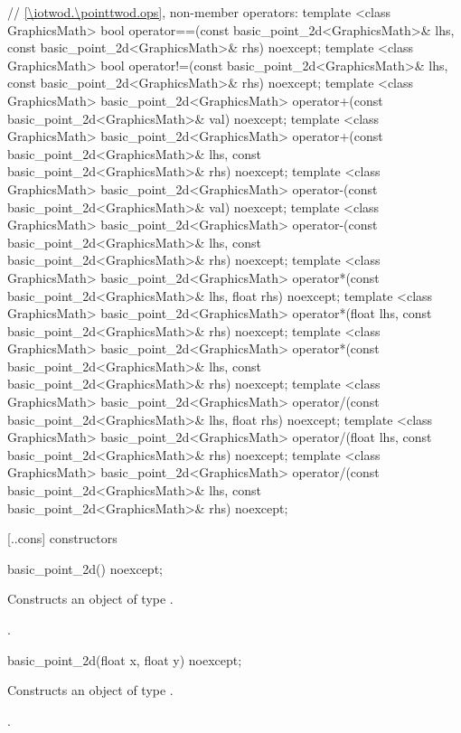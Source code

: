 \begin{codeblock}
{  // \ref{\iotwod.\pointtwod.ops}, non-member operators:
  template <class GraphicsMath>
  bool operator==(const basic_point_2d<GraphicsMath>& lhs,
    const basic_point_2d<GraphicsMath>& rhs) noexcept;
  template <class GraphicsMath>
  bool operator!=(const basic_point_2d<GraphicsMath>& lhs,
    const basic_point_2d<GraphicsMath>& rhs) noexcept;
  template <class GraphicsMath>
  basic_point_2d<GraphicsMath> operator+(const basic_point_2d<GraphicsMath>& val) noexcept;
  template <class GraphicsMath>
  basic_point_2d<GraphicsMath> operator+(const basic_point_2d<GraphicsMath>& lhs,
    const basic_point_2d<GraphicsMath>& rhs) noexcept;
  template <class GraphicsMath>
  basic_point_2d<GraphicsMath> operator-(const basic_point_2d<GraphicsMath>& val) noexcept;
  template <class GraphicsMath>
  basic_point_2d<GraphicsMath> operator-(const basic_point_2d<GraphicsMath>& lhs,
    const basic_point_2d<GraphicsMath>& rhs) noexcept;
  template <class GraphicsMath>
  basic_point_2d<GraphicsMath> operator*(const basic_point_2d<GraphicsMath>& lhs,
    float rhs) noexcept;
  template <class GraphicsMath>
  basic_point_2d<GraphicsMath> operator*(float lhs,
    const basic_point_2d<GraphicsMath>& rhs) noexcept;
  template <class GraphicsMath>
  basic_point_2d<GraphicsMath> operator*(const basic_point_2d<GraphicsMath>& lhs,
    const basic_point_2d<GraphicsMath>& rhs) noexcept;
  template <class GraphicsMath>
  basic_point_2d<GraphicsMath> operator/(const basic_point_2d<GraphicsMath>& lhs,
    float rhs) noexcept;
  template <class GraphicsMath>
  basic_point_2d<GraphicsMath> operator/(float lhs,
    const basic_point_2d<GraphicsMath>& rhs) noexcept;
  template <class GraphicsMath>
  basic_point_2d<GraphicsMath> operator/(const basic_point_2d<GraphicsMath>& lhs,
    const basic_point_2d<GraphicsMath>& rhs) noexcept;
}
\end{codeblock}

 [\iotwod.\pointtwod.cons] { constructors}

%
\begin{itemdecl}
basic_point_2d() noexcept;
\end{itemdecl}
\begin{itemdescr}
\pnum
\effects
Constructs an object of type .

\postconditions
\pnum
{}.
\end{itemdescr}

%
\begin{itemdecl}
basic_point_2d(float x, float y) noexcept;
\end{itemdecl}
\begin{itemdescr}
\effects
\pnum
Constructs an object of type .

\postconditions
\pnum
{}.
\end{itemdescr}

